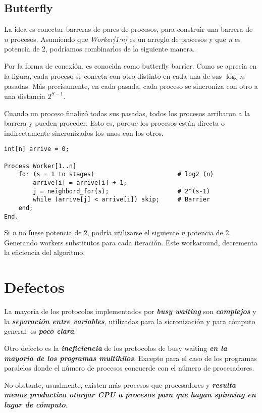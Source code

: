 \documentclass[a4paper, 10pt]{report}
\begin{document}
\subsection{Butterfly}
La idea es conectar barreras de pares de procesos, para construir una barrera de \emph{n} procesos. Asumiendo que \emph{Worker[1:n]} es un arreglo de procesos y que \emph{n} es potencia de 2, podríamos combinarlos de la siguiente manera.

Por la forma de conexión, es conocida como butterfly barrier. Como se aprecia en la figura, cada proceso se conecta con otro distinto en cada una de sus $\log_2n$ pasadas. Más precisamente, en cada pasada, cada proceso se sincroniza con otro a una distancia $2^{S-1}$.

Cuando un proceso finalizó todas sus pasadas, todos los procesos arribaron a la barrera y pueden proceder. Esto es, porque los procesos están directa o indirectamente sincronizados los unos con los otros.

\begin{lstlisting}
int[n] arrive = 0;

Process Worker[1..n]
    for (s = 1 to stages)                       # log2 (n)
        arrive[i] = arrive[i] + 1;
        j = neighbord_for(s);                   # 2^(s-1)
        while (arrive[j] < arrive[i]) skip;     # Barrier
    end;
End.
\end{lstlisting}

Si \emph{n} no fuese potencia de 2, podría utilizarse el siguiente \emph{n} potencia de 2. Generando workers substitutos para cada iteración. Este workaround, decrementa la eficiencia del algoritmo.

\section{Defectos}

La mayoría de los protocolos implementados por \textbf{\emph{busy waiting}} son \textbf{\emph{complejos}} y la \textbf{\emph{separación entre variables}}, utilizadas para la sicronización y para cómputo general, es \textbf{\emph{poco clara}}.

Otro defecto es la \textbf{\emph{ineficiencia}} de los protocolos de busy waiting \textbf{\emph{en la mayoria de los programas multihilos}}. Excepto para el caso de los programas paralelos donde el número de procesos concuerde con el número de procesadores. 

No obstante, usualmente, existen más procesos que procesadores y \textbf{\emph{resulta menos productivo otorgar CPU a procesos para que hagan spinning en lugar de cómputo}}.
\end{document}
